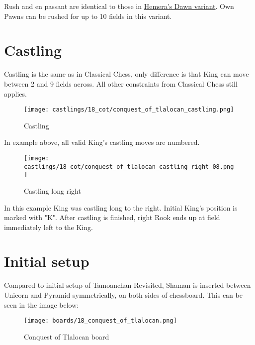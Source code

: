 Rush and en passant are identical to those in \hyperref[fig:14_hemera_s_dawn_en_passant]{Hemera's Dawn variant}.
Own Pawns can be rushed for up to 10 fields in this variant.

\clearpage %

\section*{Castling}

Castling is the same as in Classical Chess, only difference is that King can move between 2 and 9 fields across.
All other constraints from Classical Chess still applies.

\noindent
\begin{figure}[!h]
\texttt{[image: castlings/18\_cot/conquest\_of\_tlalocan\_castling.png]}
\caption{Castling}
\label{fig:conquest_of_tlalocan_castling}
\end{figure}

In example above, all valid King's castling moves are numbered.

\noindent
\begin{figure}[!h]
\texttt{[image: castlings/18\_cot/conquest\_of\_tlalocan\_castling\_right\_08.png]}
\caption{Castling long right}
\label{fig:conquest_of_tlalocan_castling_right_08}
\end{figure}

In this example King was castling long to the right. Initial King's position is marked with "K".
After castling is finished, right Rook ends up at field immediately left to the King.

\clearpage %

\section*{Initial setup}

Compared to initial setup of Tamoanchan Revisited, Shaman is inserted between Unicorn and Pyramid
symmetrically, on both sides of chessboard. This can be seen in the image below:

\noindent
\begin{figure}[h]
\texttt{[image: boards/18\_conquest\_of\_tlalocan.png]}
\caption{Conquest of Tlalocan board}
\label{fig:18_conquest_of_tlalocan}
\end{figure}

\clearpage %
